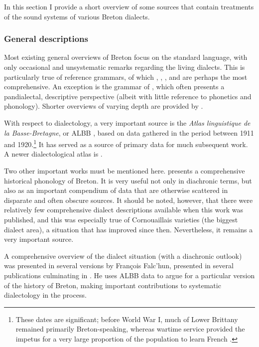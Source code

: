 In this section I provide a short overview of some sources that contain treatments of the sound systems of various Breton dialects.

\subsubsection{General descriptions}
\label{sec:general-descriptions}

Most existing general overviews of Breton focus on the standard language, with only occasional and unsystematic remarks regarding the living dialects. This is particularly true of reference grammars, of which \citet{hemon40:_gramm}, \citet{yezhadur}, \citet{trepos66:_gramm},  and \citet{press} are  perhaps the most comprehensive. An exception is the grammar of \citet{favereau01}, which often presents a pandialectal, descriptive perspective (albeit with little reference to phonetics and phonology). Shorter overviews of varying depth are provided by \citet{breton-celtl,press-lincom,ternes93:_breton,ternes11:_neubr}.

With respect to dialectology, a very important source is the \textfrench{\emph{Atlas linguistique de la Basse-Bretagne}, or ALBB} \citep{le63:_atlas_basse_bretag}, based on data gathered in the period between 1911 and 1920.\footnote{These dates are significant; before World War I, much of Lower Brittany remained primarily Breton-speaking, whereas wartime service provided the impetus for a very large proportion of the population to learn French \citep{broudic95:_la_regim}.} It has served as a source of primary data for much subsequent work. A newer dialectological atlas is \citet{le01:_nouvel_basse_bretag}.

Two other important works must be mentioned here. \citet{histbreton} presents a comprehensive historical phonology of Breton. It is very useful not only in diachronic terms, but also as an important compendium of data that are otherwise scattered in disparate and often obscure sources. It should be noted, however, that there were relatively few comprehensive dialect descriptions available when this work was published, and this was especially true of Cornouaillais varieties (the biggest dialect area), a situation that has improved since then. Nevertheless, it remains a very important source.

A comprehensive overview of the dialect situation (with a diachronic outlook) was presented in several versions by François Falc'hun, presented in several publications culminating in \citet{falchun81:_persp}. He uses ALBB data to argue for a particular version of the history of Breton, making important contributions to systematic dialectology in the process.

